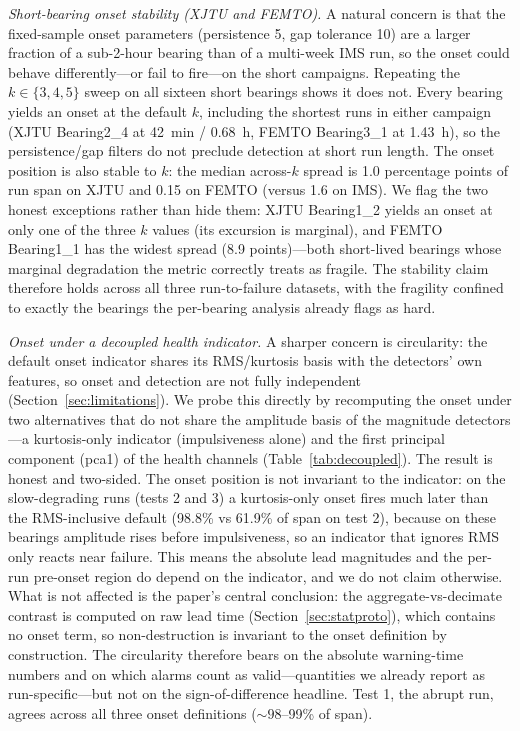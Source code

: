 \documentclass[IJPHM, 2026, 0]{PHMSociety}
\begin{document}
\emph{Short-bearing onset stability (XJTU and FEMTO).} A natural concern is that the fixed-sample onset parameters (persistence 5, gap tolerance 10) are a larger fraction of a sub-2-hour bearing than of a multi-week IMS run, so the onset could behave differently---or fail to fire---on the short campaigns. Repeating the $k \in \{3,4,5\}$ sweep on all sixteen short bearings shows it does not. Every bearing yields an onset at the default $k$, including the shortest runs in either campaign (XJTU Bearing2\_4 at 42~min / 0.68~h, FEMTO Bearing3\_1 at 1.43~h), so the persistence/gap filters do not preclude detection at short run length. The onset position is also stable to $k$: the median across-$k$ spread is 1.0 percentage points of run span on XJTU and 0.15 on FEMTO (versus 1.6 on IMS). We flag the two honest exceptions rather than hide them: XJTU Bearing1\_2 yields an onset at only one of the three $k$ values (its excursion is marginal), and FEMTO Bearing1\_1 has the widest spread (8.9 points)---both short-lived bearings whose marginal degradation the metric correctly treats as fragile. The stability claim therefore holds across all three run-to-failure datasets, with the fragility confined to exactly the bearings the per-bearing analysis already flags as hard.

\emph{Onset under a decoupled health indicator.} A sharper concern is circularity: the default onset indicator shares its RMS/kurtosis basis with the detectors' own features, so onset and detection are not fully independent (Section~\ref{sec:limitations}). We probe this directly by recomputing the onset under two alternatives that do not share the amplitude basis of the magnitude detectors---a kurtosis-only indicator (impulsiveness alone) and the first principal component (pca1) of the health channels (Table~\ref{tab:decoupled}). The result is honest and two-sided. The onset position is not invariant to the indicator: on the slow-degrading runs (tests 2 and 3) a kurtosis-only onset fires much later than the RMS-inclusive default (98.8\% vs 61.9\% of span on test 2), because on these bearings amplitude rises before impulsiveness, so an indicator that ignores RMS only reacts near failure. This means the absolute lead magnitudes and the per-run pre-onset region do depend on the indicator, and we do not claim otherwise. What is not affected is the paper's central conclusion: the aggregate-vs-decimate contrast is computed on raw lead time (Section~\ref{sec:statproto}), which contains no onset term, so non-destruction is invariant to the onset definition by construction. The circularity therefore bears on the absolute warning-time numbers and on which alarms count as valid---quantities we already report as run-specific---but not on the sign-of-difference headline. Test 1, the abrupt run, agrees across all three onset definitions (${\sim}98$--99\% of span).
\end{document}
